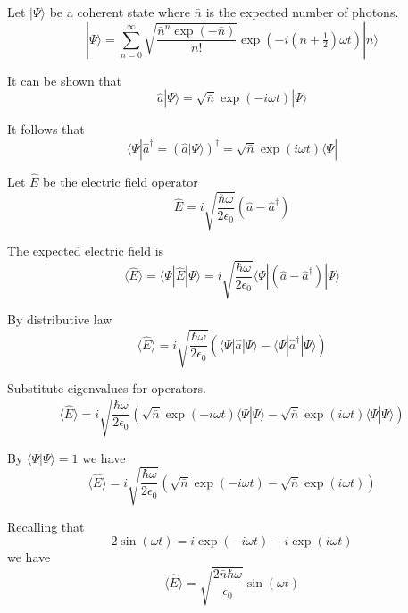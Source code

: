 \documentclass[12pt]{article}
\begin{document}
Let $|\Psi\rangle$ be a coherent state where $\bar n$ is the expected number of photons.
\begin{equation*}
|\Psi\rangle=\sum_{n=0}^\infty
\sqrt{\frac{\bar n^n\exp(-\bar n)}{n!}}
\exp\left(-i\left(n+\tfrac{1}{2}\right)\omega t\right)
|n\rangle
\end{equation*}

It can be shown that%
\begin{equation*}
\hat a|\Psi\rangle=\sqrt{\bar n}\exp(-i\omega t)|\Psi\rangle
\end{equation*}

It follows that
\begin{equation*}
\langle\Psi|\hat a^\dag=\left(\hat a|\Psi\rangle\right)^\dag=\sqrt{\bar n}\exp(i\omega t)\langle\Psi|
\end{equation*}

Let $\hat E$ be the electric field operator
\begin{equation*}
\hat E=i\sqrt{\frac{\hbar\omega}{2\epsilon_0}}
(\hat a-\hat a^\dag)
\end{equation*}

The expected electric field is
\begin{equation*}
\langle\hat E\rangle
=\langle\Psi|\hat E|\Psi\rangle
=i\sqrt{\frac{\hbar\omega}{2\epsilon_0}}
\langle\Psi|(\hat a-\hat a^\dag)|\Psi\rangle
\end{equation*}

By distributive law
\begin{equation*}
\langle\hat E\rangle
=i\sqrt{\frac{\hbar\omega}{2\epsilon_0}}
\left(\langle\Psi|\hat a|\Psi\rangle-\langle\Psi|\hat a^\dag|\Psi\rangle\right)
\end{equation*}

Substitute eigenvalues for operators.
\begin{equation*}
\langle\hat E\rangle
=i\sqrt{\frac{\hbar\omega}{2\epsilon_0}}
\left(\sqrt{\bar n}\exp(-i\omega t)\langle\Psi|\Psi\rangle-\sqrt{\bar n}\exp(i\omega t)\langle\Psi|\Psi\rangle\right)
\end{equation*}

By $\langle\Psi|\Psi\rangle=1$ we have
\begin{equation*}
\langle\hat E\rangle
=i\sqrt{\frac{\hbar\omega}{2\epsilon_0}}
\left(\sqrt{\bar n}\exp(-i\omega t)-\sqrt{\bar n}\exp(i\omega t)\right)
\end{equation*}

Recalling that
\begin{equation*}
2\sin(\omega t)=i\exp(-i\omega t)-i\exp(i\omega t)
\end{equation*}
we have
\begin{equation*}
\langle\hat E\rangle=\sqrt{\frac{2\bar n\hbar\omega}{\epsilon_0}}\sin(\omega t)
\end{equation*}
\end{document}
